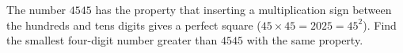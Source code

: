 The number $4545$ has the property that inserting a multiplication sign between the hundreds and tens digits gives a perfect square ($45\times45=2025=45^{2}$). Find the smallest four-digit number greater than $4545$ with the same property.
